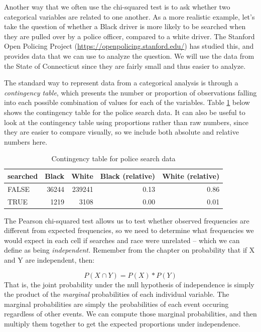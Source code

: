 \documentclass[12pt,]{book}
\theoremstyle{definition}
\theoremstyle{definition}
\theoremstyle{definition}
\theoremstyle{remark}
\begin{document}
Another way that we often use the chi-squared test is to ask whether two categorical variables are related to one another. As a more realistic example, let's take the question of whether a Black driver is more likely to be searched when they are pulled over by a police officer, compared to a white driver. The Stanford Open Policing Project (\url{https://openpolicing.stanford.edu/}) has studied this, and provides data that we can use to analyze the question. We will use the data from the State of Connecticut since they are fairly small and thus easier to analyze.

The standard way to represent data from a categorical analysis is through a \emph{contingency table}, which presents the number or proportion of observations falling into each possible combination of values for each of the variables. Table \ref{tab:policeCT} below shows the contingency table for the police search data. It can also be useful to look at the contingency table using proportions rather than raw numbers, since they are easier to compare visually, so we include both absolute and relative numbers here.

\begin{table}

\caption{\label{tab:policeCT}Contingency table for police search data}
\centering
\begin{tabular}[t]{l|r|r|r|r}
\hline
searched & Black & White & Black (relative) & White (relative)\\
\hline
FALSE & 36244 & 239241 & 0.13 & 0.86\\
\hline
TRUE & 1219 & 3108 & 0.00 & 0.01\\
\hline
\end{tabular}
\end{table}

The Pearson chi-squared test allows us to test whether observed frequencies are different from expected frequencies, so we need to determine what frequencies we would expect in each cell if searches and race were unrelated -- which we can define as being \emph{independent.} Remember from the chapter on probability that if X and Y are independent, then:

\[
P(X \cap Y) = P(X) * P(Y)
\]
That is, the joint probability under the null hypothesis of independence is simply the product of the \emph{marginal} probabilities of each individual variable. The marginal probabilities are simply the probabilities of each event occuring regardless of other events. We can compute those marginal probabilities, and then multiply them together to get the expected proportions under independence.
\end{document}
